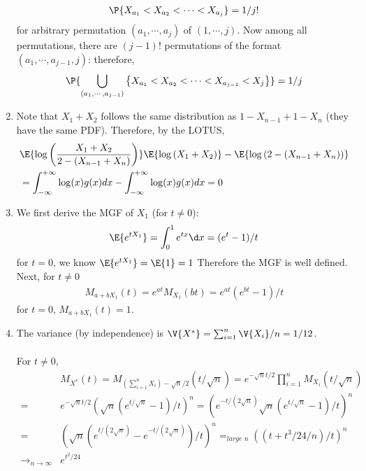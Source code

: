 \begin{exercise}
\begin{solution}
\begin{enumerate}
  		\begin{align*}
  			\P{X_{a_1}<X_{a_2}<\cdots < X_{a_j} } =1/j!
  		\end{align*}	
  		for arbitrary permutation $(a_1,\cdots, a_j)$ of $(1,\cdots, j)$. Now among all permutations, there are $(j-1)!$ permutations of the format  $(a_1,\cdots, a_{j-1}, j)$: therefore,
  		\begin{align*}
  		  \P{\bigcup_{(a_1,\cdots, a_{j-1})}\left\{X_{a_1}<X_{a_2}<\cdots < X_{a_{j-1}}<X_j\right\}} =1/j
  		\end{align*}
  	\item 			Note that  $X_1+X_2$ follows the same distribution as $1-X_{n-1}+1-X_n$ (they have the same PDF). Therefore, by the LOTUS, 
  	\begin{align*}
  		&\E{\log\left(\frac{X_1+X_2}{2-(X_{n-1}+X_{n})} \right) }\E{\log\left({X_1+X_2} \right)}- \E{\log\left( {2-(X_{n-1}+X_{n})} \right) } \\&= \int_{-\infty}^{+\infty} \log(x)g(x)dx- \int_{-\infty}^{+\infty} \log(x)g(x)dx =0
  	\end{align*}
  \item 			We first derive the MGF  of $X_1$ (for $t\neq 0$):
  \begin{align*}
  	\E{e^{tX_1}} =\int_{0}^{1} e^{tx} \d x =  (e^t-1)/t
  \end{align*}	
  for $t=0$, we know $	\E{e^{tX_1}}=	\E{1}=1$	
  Therefore the MGF is well defined. Next, for $t\neq 0$ 
  \begin{align*}
  	M_{a+b X_1}(t) = e^{at}M_{X_1}(bt)= e^{at}\left(e^{bt}-1\right)/t
  \end{align*}	
  for $t=0$, $	M_{a+b X_1}(t) = 1$.
  \item 						The variance (by independence) is $\V{X^*}=\sum_{i=1}^n\V{X_i}/n = 1/12$.\\~\\
  For $t\neq 0$,
  \begin{align*}
  	&M_{X^*}(t) = M_{\left(\sum_{i=1}^n X_i\right) -\sqrt{n}/2  }(t/\sqrt{n}) =e^{-\sqrt{n}t/2 }\prod_{i=1}^nM_{ X_i}(t/\sqrt{n})\\
  	=& e^{-\sqrt{n}t/2 } \left(\sqrt{n}\left(e^{t/\sqrt{n}} -1 \right)/t\right)^n= \left(e^{-t/(2\sqrt{n}) }\sqrt{n}\left(e^{t/\sqrt{n}} -1 \right)/t\right)^n\\
  	=&  \left(\sqrt{n}\left(e^{t/(2\sqrt{n})} -e^{-t/(2\sqrt{n}) } \right)/t\right)^n =_{\textit{large n}} \left((t+t^3/24/n)/t\right)^n\\ \rightarrow_{n\rightarrow \infty}& e^{t^2/24}
  \end{align*}	

\end{enumerate}
\end{solution}
\end{exercise}
